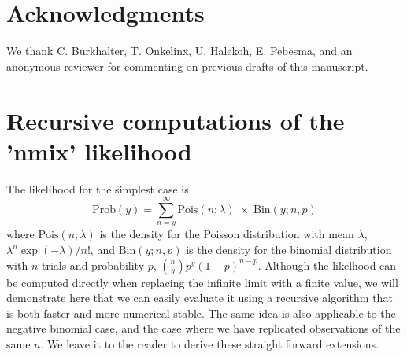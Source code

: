 \documentclass[codesnippet]{jss}
\begin{document}
\section*{Acknowledgments}
We thank C. Burkhalter, T. Onkelinx, U. Halekoh, E. Pebesma, and an anonymous reviewer for commenting on previous drafts of this manuscript.



\appendix
\section{Recursive computations of the 'nmix' likelihood}
The likelihood for the simplest case is
\begin{displaymath}
	\text{Prob}(y) = \sum_{n = y}^{\infty}
	\text{Pois}(n ; \lambda) \;\times\; \text{Bin}(y;  n, p)
\end{displaymath}
where $\text{Pois}(n; \lambda)$ is the density for the Poisson distribution with mean $\lambda$, $\lambda^{n}\exp(-\lambda)/n!$, and $\text{Bin}(y; n, p)$ is the density for the binomial distribution with $n$ trials and probability $p$, ${n \choose y} p^{y}(1-p)^{n-p}$. Although the likelhood can be computed directly when replacing the infinite limit with a finite value, we will demonstrate here that we can easily evaluate it using a recursive algorithm that is both faster and more numerical stable. The same idea is also applicable to the negative binomial case, and the case where we have replicated observations of the same $n$. We leave it to the reader to derive these straight forward extensions.
\end{document}
